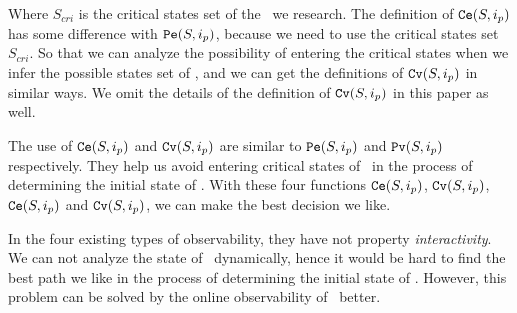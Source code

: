 Where $S_{cri}$ is the critical states set of the \BCN\ we research. The definition of ${\tt Ce}(S, i_p)$ has some difference with ${\tt Pe}(S, i_p)$, because we need to use the critical states set $S_{cri}$. So that  we can analyze the possibility of entering the  critical states when we infer the possible states set of \BCNs, and we can get the definitions of ${\tt Cv}(S, i_p)$ in similar ways. We omit the details of the definition of ${\tt Cv}(S, i_p)$ in this paper as well. 

The use of ${\tt Ce}(S, i_p)$ and ${\tt Cv}(S, i_p)$ are similar to ${\tt Pe}(S, i_p)$ and ${\tt Pv}(S, i_p)$ respectively. They help us avoid entering critical states of \BCNs\ in the process of determining the initial state of \BCNs. With these four functions ${\tt Ce}(S, i_p)$, ${\tt Cv}(S, i_p)$, ${\tt Ce}(S, i_p)$ and ${\tt Cv}(S, i_p)$, we can make the best decision we like. 

In the four existing types of observability, they have not property {\em interactivity}. We can not analyze the state of \BCNs\ dynamically, hence it would be hard to find the best path we like in the process of determining the initial state of \BCNs. However, this problem can be solved by the online observability of \BCNs\ better.